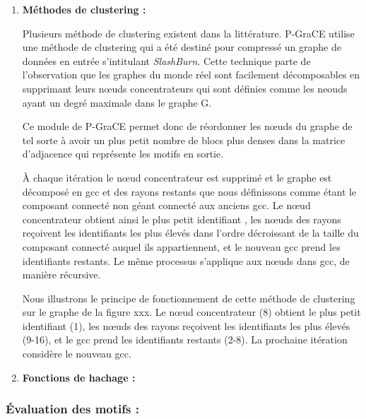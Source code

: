 \documentclass[a4paper,oneside,12pt]{report}
\theoremstyle{definition}
\begin{document}
\begin{enumerate}
\begin{algorithm}[H]
\begin{algorithmic} [1]
				\end{algorithmic}
			\end{algorithm}



\item \textbf{Méthodes de clustering :}

Plusieurs méthode de clustering existent dans la littérature. P-GraCE utilise une  méthode de clustering qui a été destiné pour compressé un graphe de données en entrée s'intitulant \textit{SlashBurn}. Cette technique parte de l'observation  que les graphes du monde réel sont facilement décomposables en supprimant leurs nœuds concentrateurs qui sont définies comme les neouds ayant un degré maximale dans le graphe G. 

Ce module de P-GraCE permet donc de réordonner les nœuds du graphe de tel sorte à avoir un plus petit nombre de blocs plus denses dans la matrice d'adjacence qui représente les motifs en sortie.  

À chaque itération le nœud concentrateur est supprimé et  le graphe est décomposé en 
\gls{gcc} et des rayons restants que nous définissons comme étant le composant connecté non géant connecté aux anciens \gls{gcc}. Le nœud concentrateur obtient ainsi le plus petit identifiant , les nœuds des rayons reçoivent les identifiants les plus élevés  dans l’ordre décroissant de la taille du composant connecté auquel ils appartiennent, et le nouveau \gls{gcc} prend les identifiants restants. Le même processus s'applique aux nœuds dans \gls{gcc}, de manière récursive.

Nous illustrons le principe de fonctionnement de cette méthode de clustering sur le graphe de la figure xxx. Le nœud concentrateur (8) obtient le plus petit identifiant (1), les nœuds des rayons reçoivent les identifiants les plus élevés (9-16), et le \gls{gcc} prend les identifiants restants (2-8). La prochaine itération considère le nouveau \gls{gcc}.





\item \textbf{Fonctions de hachage :}

\end{enumerate}
	
		
		\subsubsection{Évaluation des motifs :}
		
\end{document}
